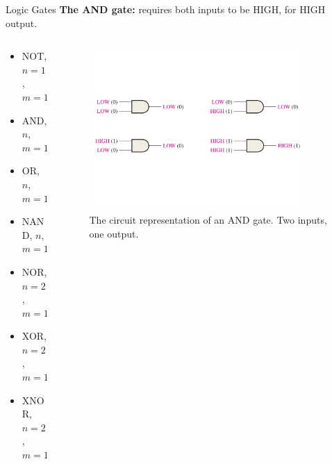 \documentclass{beamer}
\begin{document}
\begin{frame}{Logic Gates}
\textbf{The AND gate:} requires both inputs to be HIGH, for HIGH output. \\ \vspace{0.5cm}
\begin{columns}[T]
\begin{column}{0.5\textwidth}
\begin{itemize}
\item \alert{NOT, $n=1$, $m=1$}
\item \alert{AND, $n$, $m=1$}
\item OR, $n$, $m=1$
\item NAND, $n$, $m=1$
\item NOR, $n=2$, $m=1$
\item XOR, $n=2$, $m=1$
\item XNOR, $n=2$, $m=1$
\end{itemize}
\end{column}
\begin{column}{0.5\textwidth}
\begin{figure}
\centering
\includegraphics[width=0.9\textwidth,trim=0cm 5cm 0cm 5cm,clip=true]{figures/newAnd.pdf}
\caption{\label{fig:and} The circuit representation of an AND gate.  Two inputs, one output.}
\end{figure}
\end{column}
\end{columns}
\end{frame}
\end{document}
